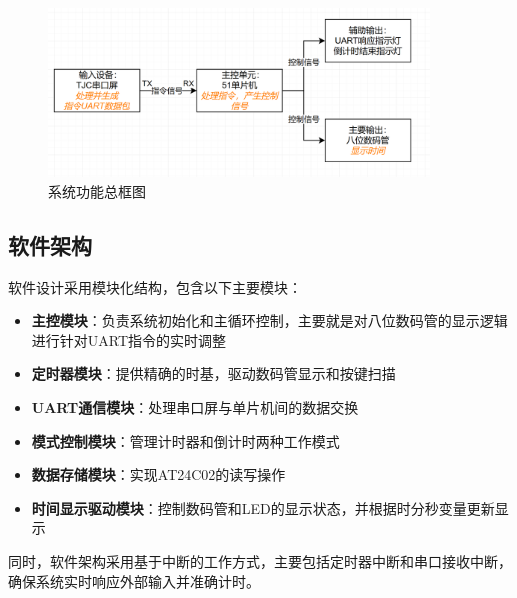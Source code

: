 \documentclass[12pt,hyperref,a4paper,UTF8]{ctexart}
\begin{document}
\begin{figure}[H]
    \centering
    \includegraphics[width=0.9\textwidth]{figures/2.png} %
    \caption{系统功能总框图}
    \label{fig:hardware-connection}
\end{figure}

\subsection{软件架构}

软件设计采用模块化结构，包含以下主要模块：

\begin{itemize}
  \item \textbf{主控模块}：负责系统初始化和主循环控制，主要就是对八位数码管的显示逻辑进行针对UART指令的实时调整
  \item \textbf{定时器模块}：提供精确的时基，驱动数码管显示和按键扫描
  \item \textbf{UART通信模块}：处理串口屏与单片机间的数据交换
  \item \textbf{模式控制模块}：管理计时器和倒计时两种工作模式
  \item \textbf{数据存储模块}：实现AT24C02的读写操作
  \item \textbf{时间显示驱动模块}：控制数码管和LED的显示状态，并根据时分秒变量更新显示
\end{itemize}

同时，软件架构采用基于中断的工作方式，主要包括定时器中断和串口接收中断，确保系统实时响应外部输入并准确计时。
\end{document}

